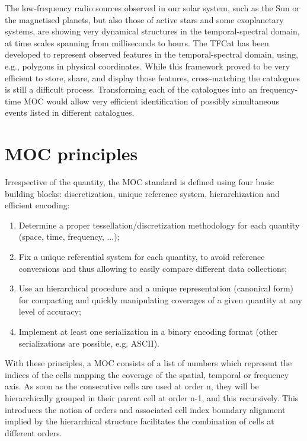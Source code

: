 \documentclass[11pt,a4paper]{ivoa}
\begin{document}
The low-frequency radio sources observed in our solar system,
such as the Sun or the magnetised planets, but also those of active stars
and some exoplanetary systems, are showing very dynamical structures in the
temporal-spectral domain, at time scales spanning from milliseconds to hours.
The TFCat \citep[Time-Frequency catalogue,][]{cecconi_2023} has been developed
to represent observed features in the temporal-spectral domain, using, e.g.,
polygons in physical coordinates.
While this framework proved to be very efficient to store, share, and display
those features, cross-matching the catalogues is still a difficult process.
Transforming each of the catalogues into an frequency-time MOC would
allow very efficient identification of possibly simultaneous events listed
in different catalogues.


\section{MOC principles}

Irrespective of the quantity, the MOC standard is defined using four basic
building blocks: discretization, unique reference system, hierarchization
and efficient encoding:
\begin{enumerate}
\item Determine a proper tessellation/discretization methodology for
  each quantity (space, time, frequency, ...);
\item Fix a unique referential system for each quantity, to avoid
  reference conversions and thus allowing to easily compare different
  data collections;
\item Use an hierarchical procedure and a unique representation
  (canonical form) for compacting and quickly manipulating
  coverages of a given quantity at any level of accuracy;
\item Implement at least one serialization in a binary encoding format
  (other serializations are possible, e.g. ASCII).
\end{enumerate}

With these principles, a MOC consists of a list of numbers which
represent the indices of the cells mapping the coverage of the spatial,
temporal or frequency axis.
As soon as the consecutive cells are used at order n, they will be
hierarchically grouped in their parent cell at order n-1, and
this recursively. This introduces the notion of orders and
associated cell index boundary alignment implied by the hierarchical structure
facilitates the combination of cells at different orders.
\end{document}

